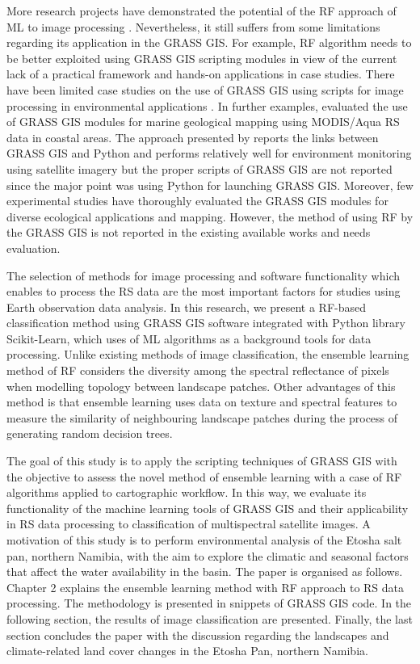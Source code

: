 \documentclass[climate,article,submit,pdftex,moreauthors]{Definitions/mdpi}
\begin{document}
More research projects have demonstrated the potential of the RF approach of ML to image processing \cite{COLLINS2020111839,WEI2020112005,WANG202294}. Nevertheless, it still suffers from some limitations regarding its application in the GRASS GIS. For example, RF algorithm needs to be better exploited using GRASS GIS scripting modules in view of the current lack of a practical framework and hands-on applications in case studies. There have been limited case studies on the use of GRASS GIS using scripts for image processing in environmental applications \cite{STRIGARO201668,geomatics5010005,ROCCHINI2017166,7326254}. In further examples, \cite{7326254} evaluated the use of GRASS GIS modules for marine geological mapping using MODIS/Aqua RS data in coastal areas. The approach presented by \cite{6407912} reports the links between GRASS GIS and Python and performs relatively well for environment monitoring using satellite imagery but the proper scripts of GRASS GIS are not reported since the major point was using Python for launching GRASS GIS. Moreover, few experimental studies have thoroughly evaluated the GRASS GIS modules for diverse ecological applications and mapping. However, the method of using RF by the GRASS GIS is not reported in the existing available works and needs evaluation. 

The selection of methods for image processing and software functionality which enables to process the RS data are the most important factors for studies using Earth observation data analysis. In this research, we present a RF-based classification method using GRASS GIS software integrated with Python library Scikit-Learn, which uses  of ML algorithms as a background tools for data processing. Unlike existing methods of image classification, the ensemble learning method of RF considers the diversity among the spectral reflectance of pixels when modelling topology between landscape patches. Other advantages of this method is that ensemble learning uses data on texture and spectral features to measure the similarity of neighbouring landscape patches during the process of generating random decision trees. 

The goal of this study is to apply the scripting techniques of GRASS GIS with the objective to assess the novel method of ensemble learning with a case of RF algorithms applied to cartographic workflow. In this way, we evaluate its functionality of the machine learning tools of GRASS GIS and their applicability in RS data processing to classification of multispectral satellite images. A motivation of this study is to perform environmental analysis of the Etosha salt pan, northern Namibia, with the aim to explore the climatic and seasonal factors that affect the water availability in the basin. The paper is organised as follows. Chapter 2 explains the ensemble learning method with RF approach to RS data processing. The methodology is presented in snippets of GRASS GIS code. In the following section, the results of image classification are presented. Finally, the last section concludes the paper with the discussion regarding the landscapes and climate-related land cover changes in the Etosha Pan, northern Namibia.
\end{document}
